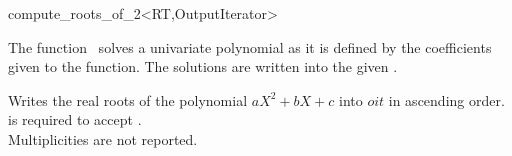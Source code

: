\begin{ccRefFunction}{compute_roots_of_2<RT,OutputIterator>}

\ccDefinition

The function \ccRefName\ solves a univariate polynomial as it is defined by the 
coefficients given to the function. The solutions are written into the given
. 


{
Writes the real roots of the polynomial $aX^2+bX+c$ into $oit$ in ascending order. \\
 is required to accept . \\
Multiplicities are not reported. \\
} 

\ccSeeAlso
{}\\
\\
\\
\\
\\
\end{ccRefFunction}
